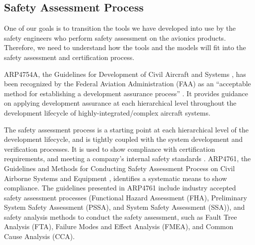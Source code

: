 \subsection{Safety Assessment Process}
\label{subsec:process}

One of our goals is to transition the tools we have developed into use by the safety engineers who perform safety assessment on the avionics products. Therefore, we need to understand how the tools and the models will fit into the safety assessment and certification process.

ARP4754A, the Guidelines for Development of Civil Aircraft and Systems \cite{SAE:ARP4754A}, has been recognized by the Federal Aviation Administration (FAA) as an ``acceptable method for establishing a development assurance process'' \cite{AC:20-174}. It provides guidance on applying development assurance at each hierarchical level throughout the development lifecycle of highly-integrated/complex aircraft systems.

The safety assessment process is a starting point at each hierarchical level of the development lifecycle, and is tightly coupled with the system development and verification processes. It is used to show compliance with certification requirements, and meeting a company's internal safety standards \cite{SAE:ARP4754A}. ARP4761, the Guidelines and Methods for Conducting Safety Assessment Process on Civil Airborne Systems and Equipment \cite{SAE:ARP4761}, identifies a systematic means to show compliance. The guidelines presented in ARP4761 include industry accepted safety assessment processes (Functional Hazard Assessment (FHA), Preliminary System Safety Assessment (PSSA), and System Safety Assessment (SSA)), and safety analysis methods to conduct the safety assessment, such as Fault Tree Analysis (FTA), Failure Modes and Effect Analysis (FMEA), and Common Cause Analysis (CCA). 

